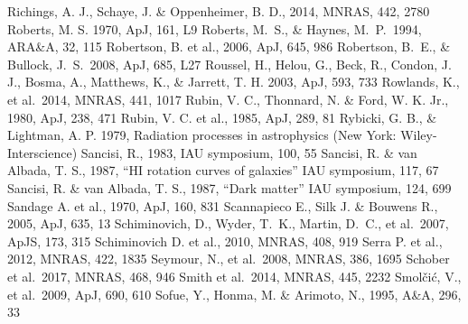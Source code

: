 \begin{thebibliography}{99}
\begin{multicols}{2}
{	Richings, A. J., Schaye, J. \& Oppenheimer, B. D., 2014, MNRAS, 442, 2780
    	Roberts, M. S. 1970, ApJ, 161, L9
	Roberts, M.~S., \& Haynes, M.~P.\ 1994, ARA\&A, 32, 115 
    	Robertson, B. et al., 2006, ApJ, 645, 986
	Robertson, B.~E., \& Bullock, J.~S.\ 2008, ApJ, 685, L27 
    	Roussel, H., Helou, G., Beck, R., Condon, J. J., Bosma, A.,
    	Matthews, K., \& Jarrett, T. H. 2003, ApJ, 593, 733
    	Rowlands, K., et al.\ 2014, MNRAS, 441, 1017
	Rubin, V. C., Thonnard, N. \& Ford, W. K. Jr., 1980, ApJ, 238, 471
	Rubin, V. C. et al., 1985, ApJ, 289, 81
	Rybicki, G. B., \& Lightman, A. P. 1979, Radiation processes in astrophysics (New York: Wiley-Interscience)
	Sancisi, R., 1983, IAU symposium, 100, 55
	Sancisi, R. \& van Albada, T. S., 1987, ``HI rotation curves of galaxies'' IAU symposium, 117, 67
	Sancisi, R. \& van Albada, T. S., 1987, ``Dark matter'' IAU symposium, 124, 699
	Sandage A. et al., 1970, ApJ, 160, 831
	Scannapieco E., Silk J. \& Bouwens R., 2005, ApJ, 635, 13
	Schiminovich, D., Wyder, T.~K., Martin, D.~C., et al.\ 2007, ApJS, 173, 315 
	Schiminovich D. et al., 2010, MNRAS, 408, 919
	Serra P. et al., 2012, MNRAS, 422, 1835
    	Seymour, N., et al.\ 2008, MNRAS, 386, 1695
    	Schober et al.\ 2017, MNRAS, 468, 946
    	Smith et al.\ 2014, MNRAS, 445, 2232
    	Smol\v{c}i\'{c}, V., et al.\ 2009, ApJ, 690, 610
	Sofue, Y., Honma, M. \& Arimoto, N., 1995, A\&A, 296, 33
}
\end{multicols}
\end{thebibliography}
